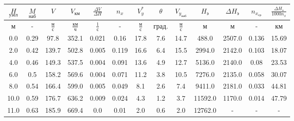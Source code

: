 \begin{tabular}{|c|c|c|c|c|c|c|c|c|c|c|c|c|}
\hline
$\underset{узел}{H}$ & $\underset{наб}{M}$ & $V$ & $V_{км}$ & $\frac{\Delta V}{\Delta H}$ & $n_x$ & $V_{y}^*$ & $\theta$ & $V_{y_{наб}}$ & $H_э$ & $\Delta H_э$ & $n_{x_{ср}}$ & $\frac{\Delta H_{э}}{1000 n_x}$ \\ 
\hline
м & - & $\frac{м}{с}$ & $\frac{км}{ч}$ & $\frac{1}{с}$ & - & $\frac{м}{с}$ & $град.$ & $\frac{м}{с}$ & м & м & - & км \\ 
\hline
0.0 & 0.29 & 97.8 & 352.1 & 0.021 & 0.16 & 17.8 & 7.6 & 14.7 & 488.0 & 2507.0 & 0.136 & 15.69 \\ 
\hline
2.0 & 0.42 & 139.7 & 502.8 & 0.005 & 0.119 & 16.6 & 6.4 & 15.5 & 2994.0 & 2142.0 & 0.103 & 18.07 \\ 
\hline
4.0 & 0.46 & 149.3 & 537.5 & 0.004 & 0.091 & 13.6 & 4.9 & 12.7 & 5136.0 & 2140.0 & 0.08 & 23.53 \\ 
\hline
6.0 & 0.5 & 158.2 & 569.6 & 0.004 & 0.071 & 11.2 & 3.8 & 10.5 & 7276.0 & 2135.0 & 0.058 & 30.07 \\ 
\hline
8.0 & 0.54 & 166.4 & 599.0 & 0.005 & 0.049 & 8.1 & 2.6 & 7.4 & 9411.0 & 2181.0 & 0.033 & 44.81 \\ 
\hline
10.0 & 0.59 & 176.7 & 636.2 & 0.009 & 0.024 & 4.3 & 1.2 & 3.7 & 11592.0 & 1170.0 & 0.014 & 47.79 \\ 
\hline
11.0 & 0.63 & 185.9 & 669.4 & 0.0 & 0.01 & 2.0 & 0.6 & 2.0 & 12762.0 & - & - & - \\ 
\hline
\end{tabular}
